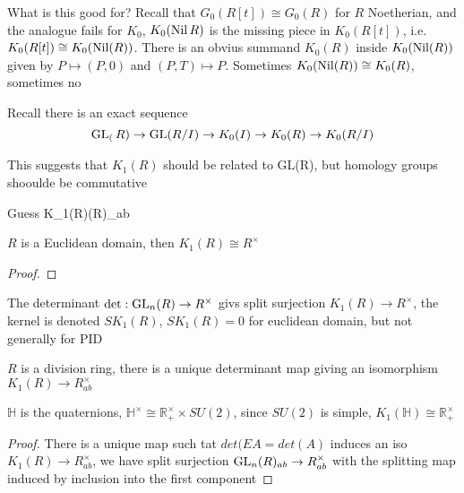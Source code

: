 \documentclass[main]{subfiles}
\begin{document}
What is this good for? Recall that $G_0(R[t])\cong G_0(R)$ for $R$ Noetherian, and the analogue fails for $K_0$, $K_0(\operatorname{Nil} R)$ is the missing piece in $K_0(R[t])$, i.e. $K_0(R[t])\cong K_0(\operatorname{Nil}(R))$. There is an obvius summand $K_0(R)$ inside $K_0(\operatorname{Nil}(R))$ given by $P\mapsto(P,0)$ and $(P,T)\mapsto P$. Sometimes $K_0(\operatorname{Nil}(R))\cong K_0(R)$, sometimes no













Recall there is an exact sequence
\[\operatorname{GL}_(R)\to\operatorname{GL}(R/I)\to K_0(I)\to K_0(R)\to K_0(R/I)\]

This suggests that $K_1(R)$ should be related to GL(R), but homology groups shooulde be commutative

Guess K_1(R)\cong\Gl(R)_{ab}

\begin{theorem}
$R$ is a Euclidean domain, then $K_1(R)\cong R^\times$
\end{theorem}

\begin{proof}

\end{proof}

\begin{remark}
The determinant $\det:\operatorname{GL}_n(R)\to R^\times$ givs split surjection $K_1(R)\to R^\times$, the kernel is denoted $SK_1(R)$, $SK_1(R)=0$ for euclidean domain, but not generally for PID
\end{remark}

\begin{theorem}[Dieudonn\'e]
$R$ is a division ring, there is a unique determinant map giving an isomorphism $K_1(R)\to R^\times_{ab}$
\end{theorem}

\begin{example}
$\mathbb H$ is the quaternions, $\mathbb H^\times\cong \mathbb R^\times_+\times SU(2)$, since $SU(2)$ is simple, $K_1(\mathbb H)\cong\mathbb R^\times_+$
\end{example}

\begin{proof}
There is a unique map such tat $det(EA=det(A)$
\det induces an iso $K_1(R)\to R^\times_{ab}$, we have split surjection $\operatorname{GL}_n(R)_{ab}\to R^\times_{ab}$ with the splitting map induced by inclusion into the first component
\end{proof}
\end{document}
